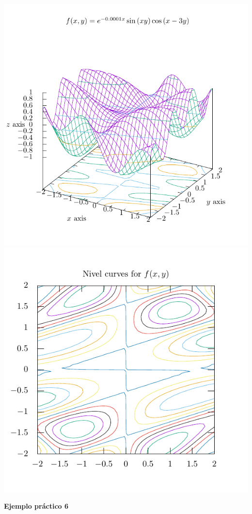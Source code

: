 \documentclass[11.5pt,a4paper]{article}
\begin{document}
\includegraphics[scale=0.8]{ejemplo10.pdf}
\includegraphics[scale=0.8]{ejemplo11.pdf}

\textbf{Ejemplo práctico 6}
\end{document}

